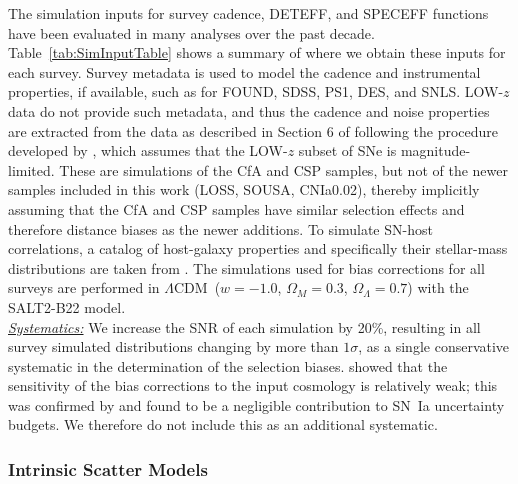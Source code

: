 \documentclass[twocolumn]{aastex63}
\def\LCDM{$\Lambda$CDM}
\begin{document}
{The simulation inputs for survey cadence, DETEFF, and SPECEFF functions 
have been evaluated in many analyses over the past decade. Table~\ref{tab:SimInputTable} shows
a summary of where we obtain these inputs for each survey. 
Survey metadata is used to model the cadence and instrumental properties, if available, such as for 
FOUND, SDSS, PS1, DES, and SNLS. LOW-$z$ data do not provide such
metadata, and thus the cadence and noise properties are extracted
from the data as described in} Section 6 of \cite{Kessler18}  following the procedure developed by \cite{Scolnic18}, which assumes that the LOW-$z$ subset of SNe is magnitude-limited. 
{These are simulations of the CfA and CSP samples, but not of the newer samples included in this work (LOSS, SOUSA, CNIa0.02), thereby implicitly assuming that the CfA and CSP} samples have similar selection effects and therefore distance biases as the newer additions. To simulate SN-host correlations, a catalog of host-galaxy properties and specifically their stellar-mass distributions are taken from \cite{popovic21a}. 
The simulations used for bias corrections for all surveys are performed in \LCDM~($w=-1.0$, $\Omega_M=0.3$, $\Omega_\Lambda=0.7$) with the SALT2-B22 model. \\
\uline{\textit{Systematics:}} We increase the SNR of each simulation by 20\%, resulting in all survey simulated distributions changing by more than $1\sigma$, as a { single} conservative systematic in the determination of the selection biases. \cite{BBC} showed that the sensitivity of the bias corrections to the input cosmology is relatively weak; this was confirmed by \cite{Brout18b} and found to be a negligible contribution to SN~Ia uncertainty budgets. We therefore do not include this as an additional systematic.\\

\subsubsection{\textbf{Intrinsic Scatter Models}}
\label{subsubsection:intrinsic}
\end{document}
